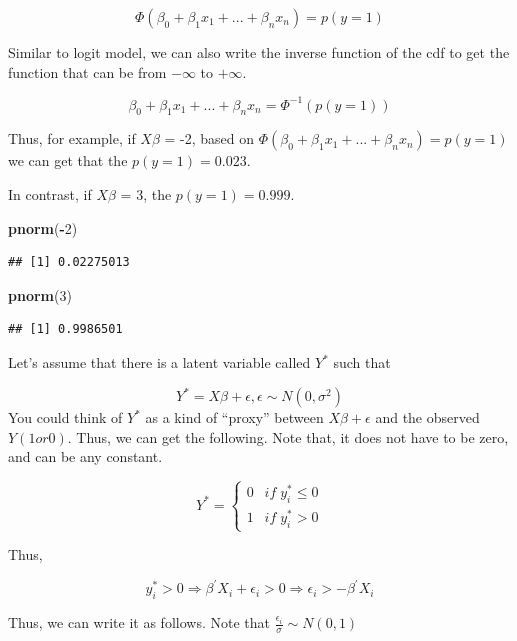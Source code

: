 \documentclass[]{book}
\newenvironment{Shaded}{\begin{snugshade}}{\end{snugshade}}
\newcommand{\DecValTok}[1]{\textcolor[rgb]{0.00,0.00,0.81}{#1}}
\newcommand{\KeywordTok}[1]{\textcolor[rgb]{0.13,0.29,0.53}{\textbf{#1}}}
\newcommand{\NormalTok}[1]{#1}
\newcommand{\OperatorTok}[1]{\textcolor[rgb]{0.81,0.36,0.00}{\textbf{#1}}}
\begin{document}
\[\Phi(\beta_0+\beta_1x_1+...+\beta_nx_n )= p(y=1)\]

Similar to logit model, we can also write the inverse function of the cdf to get the function that can be from \(-\infty\) to \(+\infty\).

\[\beta_0+\beta_1x_1+...+\beta_nx_n =\Phi^{-1}(p(y=1))\]

Thus, for example, if \(X\beta\) = -2, based on \(\Phi(\beta_0+\beta_1x_1+...+\beta_nx_n )= p(y=1)\) we can get that the \(p(y=1)=0.023\).

In contrast, if \(X\beta\) = 3, the \(p(y=1)=0.999\).

\begin{Shaded}
\begin{Highlighting}[]
\KeywordTok{pnorm}\NormalTok{(}\OperatorTok{-}\DecValTok{2}\NormalTok{)}
\end{Highlighting}
\end{Shaded}

\begin{verbatim}
## [1] 0.02275013
\end{verbatim}

\begin{Shaded}
\begin{Highlighting}[]
\KeywordTok{pnorm}\NormalTok{(}\DecValTok{3}\NormalTok{)}
\end{Highlighting}
\end{Shaded}

\begin{verbatim}
## [1] 0.9986501
\end{verbatim}

Let's assume that there is a latent variable called \(Y^*\) such that

\[Y^*=X\beta+\epsilon, \epsilon \sim N(0,\sigma^2)\]
You could think of \(Y^*\) as a kind of ``proxy'' between \(X\beta+\epsilon\) and the observed \(Y (1 or 0)\). Thus, we can get the following. Note that, it does not have to be zero, and can be any constant.

\[
Y^*=\begin{cases} 0 \;\;\: if \;  y_i^* \leq 0 \\ 1 \;\;\: if \;  y_i^* > 0 \end{cases}
\]

Thus,

\[y_i^* > 0 \Rightarrow \beta^{'}X_i + \epsilon_i >0 \Rightarrow \epsilon_i > -\beta^{'}X_i\]

Thus, we can write it as follows. Note that \(\frac{ \epsilon_i}{\sigma} \sim N(0,1)\)
\end{document}
